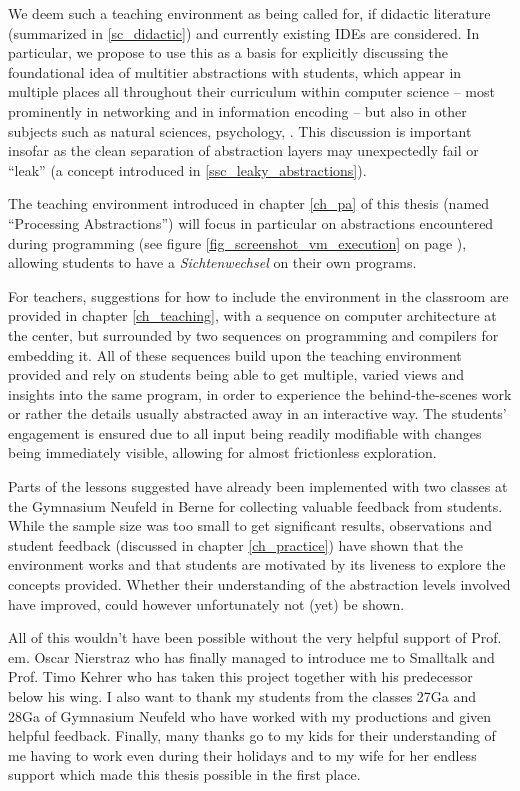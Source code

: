 We deem such a teaching environment as being called for, if didactic literature (summarized in \ref{sc_didactic}) and currently existing \acp{IDE} are considered. In particular, we propose to use this as a basis for explicitly discussing the foundational idea of multitier abstractions with students, which appear in multiple places all throughout their curriculum within computer science -- most prominently in networking and in information encoding -- but also in other subjects such as natural sciences, psychology, \etc. This discussion is important insofar as the clean separation of abstraction layers may unexpectedly fail or ``leak'' (a concept introduced in \ref{ssc_leaky_abstractions}).

The teaching environment introduced in chapter \ref{ch_pa} of this thesis (named ``Processing Abstractions'') will focus in particular on abstractions encountered during programming (see \eg figure \ref{fig_screenshot_vm_execution} on page \pageref{fig_screenshot_vm_execution}), allowing students to have a \emph{Sichtenwechsel} on their own programs.

For teachers, suggestions for how to include the environment in the classroom are provided in chapter \ref{ch_teaching}, with a sequence on computer architecture at the center, but surrounded by two sequences on programming and compilers for embedding it. All of these sequences build upon the teaching environment provided and rely on students being able to get multiple, varied views and insights into the same program, in order to experience the behind-the-scenes work or rather the details usually abstracted away in an interactive way. The students' engagement is ensured due to all input being readily modifiable with changes being immediately visible, allowing for almost frictionless exploration.

Parts of the lessons suggested have already been implemented with two classes at the Gymnasium Neufeld in Berne for collecting valuable feedback from students. While the sample size was too small to get significant results, observations and student feedback (discussed in chapter \ref{ch_practice}) have shown that the environment works and that students are motivated by its liveness to explore the concepts provided. Whether their understanding of the abstraction levels involved have improved, could however unfortunately not (yet) be shown.

All of this wouldn't have been possible without the very helpful support of Prof.\,em. Oscar Nierstraz who has finally managed to introduce me to Smalltalk and Prof. Timo Kehrer who has taken this project together with his predecessor below his wing. I also want to thank my students from the classes 27Ga and 28Ga of Gymnasium Neufeld who have worked with my productions and given helpful feedback. Finally, many thanks go to my kids for their understanding of me having to work even during their holidays and to my wife for her endless support which made this thesis possible in the first place.
